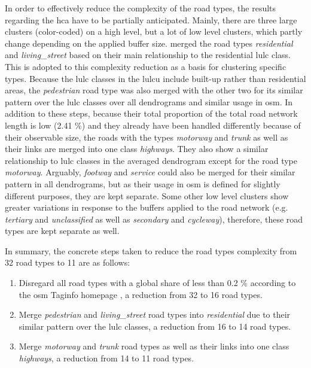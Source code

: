 In order to effectively reduce the complexity of the road types, the results regarding the \gls{hca} have to be partially anticipated. Mainly, there are three large clusters (color-coded) on a high level, but a lot of low level clusters, which partly change depending on the applied buffer size. \textcite{Atwal.Anderson.ea2022} merged the road types \emph{residential} and \emph{living\_street} based on their main relationship to the residential \gls{lulc} class. This is adopted to this complexity reduction as a basis for clustering specific types. Because the \gls{lulc} classes in the \gls{lulcu} include built-up rather than residential areas, the \emph{pedestrian} road type was also merged with the other two for its similar pattern over the \gls{lulc} classes over all dendrograms and similar usage in \gls{osm}. In addition to these steps, because their total proportion of the total road network length is low (2.41 \%) and they already have been handled differently because of their observable size, the roads with the types \emph{motorway} and \emph{trunk} as well as their links are merged into one class \emph{highways}. They also show a similar relationship to \gls{lulc} classes in the averaged dendrogram except for the road type \emph{motorway}. Arguably, \emph{footway} and \emph{service} could also be merged for their similar pattern in all dendrograms, but as their usage in \gls{osm} is defined for slightly different purposes, they are kept separate. Some other low level clusters show greater variations in response to the buffers applied to the road network (e.g. \emph{tertiary} and \emph{unclassified} as well as \emph{secondary} and \emph{cycleway}), therefore, these road types are kept separate as well. 

In summary, the concrete steps taken to reduce the road types complexity from 32 road types to 11 are as follows:

\begin{enumerate}
    \item Disregard all road types with a global share of less than 0.2 \% according to the \gls{osm} Taginfo homepage \autocite{OSMTaginfo2024}, a reduction from 32 to 16 road types.
    \item Merge \emph{pedestrian} and \emph{living\_street} road types into \emph{residential} due to their similar pattern over the \gls{lulc} classes, a reduction from 16 to 14 road types.
    \item Merge \emph{motorway} and \emph{trunk} road types as well as their links into one class \emph{highways}, a reduction from 14 to 11 road types.
\end{enumerate}

